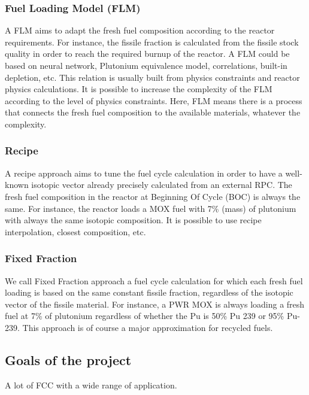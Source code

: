 \documentclass[review]{elsarticle}
\begin{document}
\subsubsection{Fuel Loading Model (FLM)}

A FLM aims to adapt the fresh fuel composition according to the reactor requirements. For instance, the fissile fraction is calculated from the fissile stock quality in order to reach the required burnup of the reactor. A FLM could be based on neural network, Plutonium equivalence model, correlations, built-in depletion, etc. This relation is usually built from physics constraints and reactor physics calculations. It is possible to increase the complexity of the FLM according to the level of physics constraints. Here, FLM means there is a process that connects the fresh fuel composition to the available materials, whatever the complexity.

\subsubsection{Recipe}

A recipe approach aims to tune the fuel cycle calculation in order to have a well-known isotopic vector already precisely calculated from an external RPC. The fresh fuel composition in the reactor at Beginning Of Cycle (BOC) is always the same. For instance, the reactor loads a MOX fuel with 7\% (mass) of plutonium with always the same isotopic composition. It is possible to use recipe interpolation, closest composition, etc.  

\subsubsection{Fixed Fraction}

We call Fixed Fraction approach a fuel cycle calculation for which each fresh fuel loading is based on the same constant fissile fraction, regardless of the isotopic vector of the fissile material. For instance, a PWR MOX is always loading a fresh fuel at 7\% of plutonium regardless of whether the Pu is 50\% Pu 239 or 95\% Pu-239. This approach is of course a major approximation for recycled fuels.

\subsection{Goals of the project}

A lot of FCC with a wide range of application. 
\end{document}
